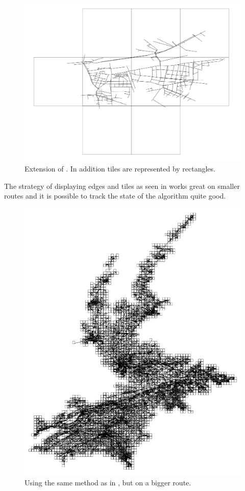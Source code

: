 \documentclass
[
    paper = a4,
    pagesize,
    12 pt,
    oneside,                       %
    open = right,
    DIV = calc,
    BCOR = 0 mm,                   %
    bibtotoc
]
{scrbook}
\begin{document}
\begin{figure}
    \includegraphics[width=\textwidth]{Images/vis-rectangular-tiles-small.png}
\caption[]{Extension of . In addition tiles are represented by rectangles.}
\label{fig:rectangle_tiles}
\end{figure}

The strategy of displaying edges and tiles as seen in   works great on smaller routes and it is possible to track the state of the algorithm quite good.

\begin{figure}
    \includegraphics[width=\textwidth]{Images/vis-rectangular-tiles.png}
\caption[]{Using the same method as in , but on a bigger route.}
\label{fig:rectangle_tiles_big}
\end{figure}
\end{document}
